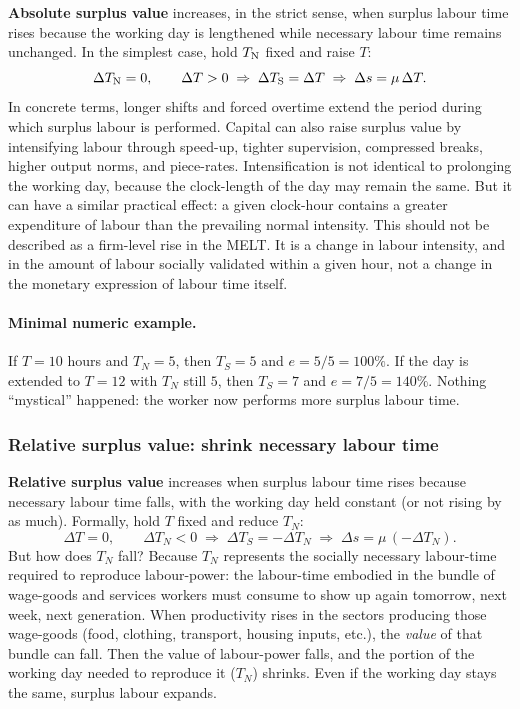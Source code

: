 \textbf{Absolute surplus value} increases, in the strict sense, when surplus labour time rises because the working day is lengthened while necessary labour time remains unchanged. In the simplest case, hold \(T_{\mathrm{N}}\) fixed and raise \(T\):
\[
\Delta T_{\mathrm{N}} = 0, \qquad
\Delta T > 0
\;\Rightarrow\;
\Delta T_{\mathrm{S}} = \Delta T
\;\Rightarrow\;
\Delta s = \mu\,\Delta T.
\]
In concrete terms, longer shifts and forced overtime extend the period during which surplus labour is performed. Capital can also raise surplus value by intensifying labour through speed-up, tighter supervision, compressed breaks, higher output norms, and piece-rates. Intensification is not identical to prolonging the working day, because the clock-length of the day may remain the same. But it can have a similar practical effect: a given clock-hour contains a greater expenditure of labour than the prevailing normal intensity. This should not be described as a firm-level rise in the MELT. It is a change in labour intensity, and in the amount of labour socially validated within a given hour, not a change in the monetary expression of labour time itself.

\paragraph{Minimal numeric example.}
If $T=10$ hours and $T_N=5$, then $T_S=5$ and $e=5/5=100\%$.
If the day is extended to $T=12$ with $T_N$ still $5$, then $T_S=7$ and $e=7/5=140\%$.
Nothing “mystical” happened: the worker now performs more surplus labour time.

\subsubsection*{Relative surplus value: shrink necessary labour time}

\textbf{Relative surplus value} increases when surplus labour time rises because necessary labour
time falls, with the working day held constant (or not rising by as much). Formally, hold $T$ fixed
and reduce $T_N$:
\[
  \Delta T = 0,
  \qquad
  \Delta T_N < 0
  \;\Rightarrow\;
  \Delta T_S = -\Delta T_N
  \;\Rightarrow\;
  \Delta s = \mu\,(-\Delta T_N).
\]
But how does $T_N$ fall? Because $T_N$ represents the socially necessary labour-time required
to reproduce labour-power: the labour-time embodied in the bundle of wage-goods and services
workers must consume to show up again tomorrow, next week, next generation. When productivity
rises in the sectors producing those wage-goods (food, clothing, transport, housing inputs, etc.),
the \emph{value} of that bundle can fall. Then the value of labour-power falls, and the portion of
the working day needed to reproduce it ($T_N$) shrinks. Even if the working day stays the same,
surplus labour expands.

